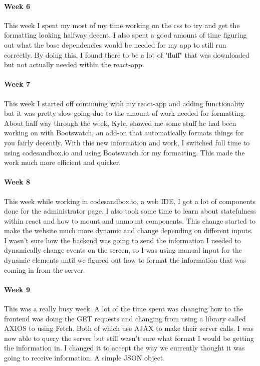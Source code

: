 \documentclass[draftclsnofoot, onecolumn, compsoc, 10pt]{IEEEtran}
\begin{document}
\paragraph{Week 6}
This week I spent my most of my time working on the css to try and get the formatting looking halfway decent. I also spent a good amount of time figuring out what the base dependencies would be needed for my app to still run correctly. By doing this, I found there to be a lot of "fluff" that was downloaded but not actually needed within the react-app. 
\paragraph{Week 7}
This week I started off continuing with my react-app and adding functionality but it was pretty slow going due to the amount of work needed for formatting. About half way through the week, Kyle, showed me some stuff he had been working on with Bootswatch, an add-on that automatically formats things for you fairly decently. With this new information and work, I switched full time to using codesandbox.io and using Bootswatch for my formatting. This made the work much more efficient and quicker. 
\paragraph{Week 8}
This week while working in codesandbox.io, a web IDE, I got a lot of components done for the administrator page. I also took some time to learn about statefulness within react and how to mount and unmount components. This change started to make the website much more dynamic and change depending on different inputs. I wasn't sure how the backend was going to send the information I needed to dynamically change events on the screen, so I was using manual input for the dynamic elements until we figured out how to format the information that was coming in from the server.
\paragraph{Week 9}
This was a really busy week. A lot of the time spent was changing how to the frontend was doing the GET requests and changing from using a library called AXIOS to using Fetch. Both of which use AJAX to make their server calls. I was now able to query the server but still wasn't sure what format I would be getting the information in. I changed it to accept the way we currently thought it was going to receive information. A simple JSON object.  
\end{document}
